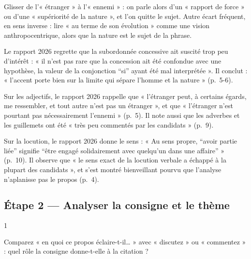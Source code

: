 \documentclass[11pt,a4paper]{article}
\begin{document}
\begin{piege}

Glisser de l'« étranger » à l'« ennemi » : on parle alors d'un « rapport de force » ou d'une « supériorité de la nature », et l'on quitte le sujet. Autre écart fréquent, en sens inverse : lire « au terme de son évolution » comme une vision anthropocentrique, alors que la nature est le sujet de la phrase.

\end{piege}

\begin{jury}

Le rapport 2026 regrette que la subordonnée concessive ait suscité trop peu d'intérêt : « il n'est pas rare que la concession ait été confondue avec une hypothèse, la valeur de la conjonction ``si'' ayant été mal interprétée ». Il conclut : « l'accent porte bien sur la limite qui sépare l'homme et la nature » (p.~5-6).

\end{jury}

\begin{jury}

Sur les adjectifs, le rapport 2026 rappelle que « l'étranger peut, à certains égards, me ressembler, et tout autre n'est pas un étranger », et que « l'étranger n'est pourtant pas nécessairement l'ennemi » (p.~5). Il note aussi que les adverbes et les guillemets ont été « très peu commentés par les candidats » (p.~9).

\end{jury}

\begin{jury}

Sur la locution, le rapport 2026 donne le sens : « Au sens propre, ``avoir partie liée'' signifie ``être engagé solidairement avec quelqu'un dans une affaire'' » (p.~10). Il observe que « le sens exact de la locution verbale a échappé à la plupart des candidats », et s'est montré bienveillant pourvu que l'analyse n'aplanisse pas le propos (p.~4).

\end{jury}

\hypertarget{uxe9tape-2-analyser-la-consigne-et-le-thuxe8me}{%
\subsection{Étape 2 --- Analyser la consigne et le thème}\label{uxe9tape-2-analyser-la-consigne-et-le-thuxe8me}}

\begin{indication}{1}

Comparez « en quoi ce propos éclaire-t-il\ldots{} » avec « discutez » ou « commentez » : quel rôle la consigne donne-t-elle à la citation ?

\end{indication}
\end{document}
